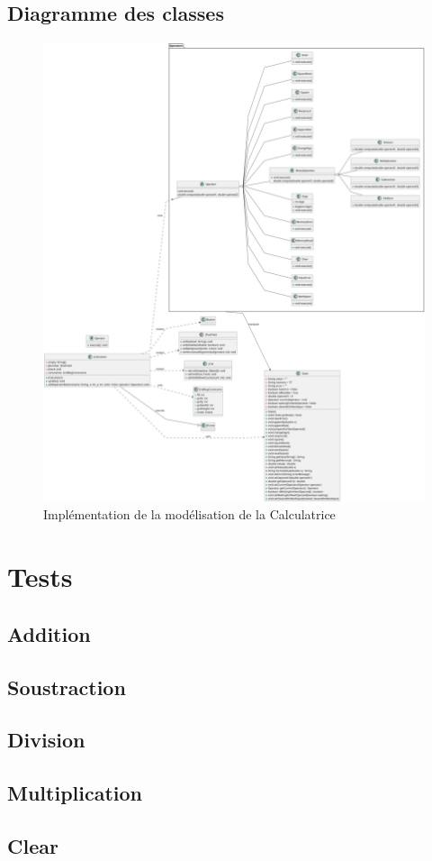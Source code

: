 \documentclass[12pt, a4paper, onecolumn]{article}
\begin{document}
\subsection{Diagramme des classes}
\begin{figure}[H]
	\centering
	\includegraphics[width=1\textwidth]{../UML_Diagrams/diagram_final.jpeg}
	\caption{Implémentation de la modélisation de la Calculatrice}
\end{figure}

\section{Tests}
\subsection{Addition}
\subsection{Soustraction}
\subsection{Division}
\subsection{Multiplication}	

\subsection{Clear}
\end{document}
